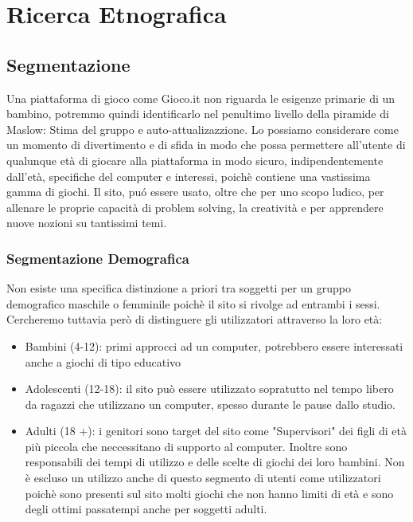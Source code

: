 \documentclass[../Report.tex]{subfiles}
\begin{document}
    \chapter{Ricerca Etnografica}
    \label{chapter:ricerca etnografica}
    \section{Segmentazione}
    Una piattaforma di gioco come Gioco.it non riguarda le esigenze primarie di un bambino, potremmo quindi  identificarlo nel penultimo livello della piramide di Maslow: Stima del gruppo e auto-attualizazzione.
    Lo possiamo considerare come un momento di divertimento e di sfida in modo che possa permettere all’utente di qualunque età di giocare alla piattaforma in modo sicuro, indipendentemente dall’età, specifiche del computer e interessi, poichè contiene una vastissima gamma di giochi. 
    Il sito, puó essere usato, oltre che per uno scopo ludico, per allenare le proprie capacità di problem solving, la creatività e per apprendere nuove nozioni su tantissimi temi.

    \subsection{Segmentazione Demografica}
    
    Non esiste una specifica distinzione a priori tra soggetti per un gruppo demografico maschile o femminile poichè il sito si rivolge ad entrambi i sessi. Cercheremo tuttavia però di distinguere gli utilizzatori attraverso la loro età:
    \begin{itemize}
        \item Bambini (4-12): primi approcci ad un computer, potrebbero essere interessati anche a giochi di tipo educativo
        \item Adolescenti (12-18): il sito può essere utilizzato sopratutto nel tempo libero da ragazzi che utilizzano un computer, spesso durante le pause dallo studio. 
        \item Adulti (18 +): i genitori sono target del sito come "Supervisori" dei figli di età più piccola che neccessitano di supporto al computer. Inoltre sono responsabili dei tempi di utilizzo e delle scelte di giochi dei loro bambini. Non è escluso un utilizzo anche di questo segmento di utenti come utilizzatori poichè sono presenti sul sito molti giochi che non hanno limiti di età e sono degli ottimi passatempi anche per soggetti adulti. 
    \end{itemize}
\end{document}

